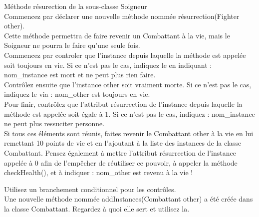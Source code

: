 \begin{Exercice}[10 minutes] Méthode résurection de la sous-classe Soigneur \\

Commencez par déclarer une nouvelle méthode nommée résurrection(Fighter other). \\

Cette méthode permettra de faire revenir un Combattant à la vie, mais le Soigneur ne pourra le faire qu'une seule fois. \\

Commencez par controler que l'instance depuis laquelle la méthode est appelée soit toujours en vie. Si ce n'est pas le cas, indiquez le en indiquant : nom\_instance est mort et ne peut plus rien faire.  \\ 

Contrôlez ensuite que l'instance other soit vraiment morte. Si ce n'est pas le cas, indiquez le via : nom\_other est toujours en vie. \\

Pour finir, contrôlez que l'attribut résurrection de l'instance depuis laquelle la méthode est appelée soit égale à 1. Si ce n'est pas le cas, indiquez : nom\_instance ne peut plus ressuciter personne.\\

Si tous ces éléments sont réunis, faites revenir le Combattant other à la vie en lui remettant 10 points de vie et en l'ajoutant à la liste des instances de la classe Combattant. Pensez également à mettre l'attribut résurrection de l'instance appelée à   
0 afin de l'empêcher de réutiliser ce pouvoir, à appeler la méthode checkHealth(), et à indiquer : nom\_other est revenu à la vie ! \\

\begin{conseil}
Utilisez un branchement conditionnel pour les contrôles. \\

Une nouvelle méthode nommée addInstances(Combattant other) a été créée dans la classe Combattant. Regardez à quoi elle sert et utilisez la. \\
\end{conseil}

\begin{solution}
	
\end{solution}

\end{Exercice}

